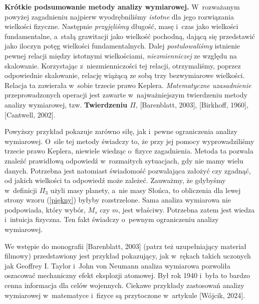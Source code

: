 
{\bf Krótkie podsumowanie metody analizy wymiarowej.} W~rozważanym powyżej zagadnieniu najpierw wyodrębniliśmy {\it istotne} dla jego rozwiązania wielkości fizyczne. Następnie {\it przyjęliśmy} długość, masę i~czas jako wielkości fundamentalne, a~stałą grawitacji jako wielkość pochodną, dającą się przedstawić jako iloczyn potęg wielkości fundamentalnych. Dalej {\it postulowaliśmy} istnienie pewnej relacji między istotnymi wielkościami, {\it niezmienniczej} ze względu na skalowanie. Korzystając z~niezmienniczości tej relacji, otrzymaliśmy, poprzez odpowiednie skalowanie, relację wiążącą ze sobą trzy bezwymiarowe wielkości.
Relacja ta zawierała w~sobie trzecie prawo Keplera.
{\it Matematyczne uzasadnienie} przeprowadzonych operacji jest zawarte w~najważniejszym twierdzeniu metody analizy wymiarowej, tzw. {\bf Twierdzeniu $\Pi$}, [Barenblatt, 2003], [Birkhoff, 1960], [Cantwell, 2002].

Powyższy przykład pokazuje zarówno siłę, jak i~pewne ograniczenia analizy wymiarowej.
O~sile tej metody świadczy to, że przy jej pomocy wyprowadziliśmy trzecie prawo Keplera, niewiele wiedząc o~fizyce zagadnienia. Metoda ta pozwala znaleźć prawidłową odpowiedź w~rozmaitych sytuacjach, gdy nie mamy wielu danych. Potrzebna jest natomiast świadomość pozwalająca założyć czy zgadnąć, od jakich wielkości ta odpowiedź może zależeć.
Zauważmy, że gdybyśmy w~definicji $\Pi_3$ użyli masy planety, a~nie masy Słońca, to obliczenia dla lewej strony wzoru (\ref{piękny}) byłyby rozstrzelone. Sama analiza wymiarowa nie podpowiada, który wybór, $M_s$ czy $m$, jest właściwy. Potrzebna zatem jest wiedza i~intuicja fizyczna. Ten fakt świadczy o~pewnym ograniczeniu analizy wymiarowej. 

We wstępie do monografii [Barenblatt, 2003] (patrz też uzupełniający materiał filmowy) przedstawiony jest przykład pokazujący, jak w~rękach takich uczonych jak Geoffrey I. Taylor i~John von Neumann analiza wymiarowa pozwoliła oszacować mechaniczny efekt eksplozji atomowej. Był rok 1940 i~była to bardzo cenna informacja dla celów wojennych. 
Ciekawe przykłady zastosowań analizy wymiarowej w~matematyce i~fizyce są przytoczone w~artykule [Wójcik, 2024].

